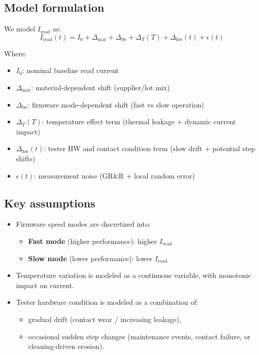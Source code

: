 \documentclass[11pt,a4paper]{article}
\begin{document}
	\subsection{Model formulation}
	We model $I_{\text{read}}$ as:
	\[
	I_{\text{read}}(t) = I_0 + \Delta_{\text{mat}} + \Delta_{\text{fw}} + \Delta_T(T) + \Delta_{\text{hw}}(t) + \epsilon(t)
	\]
	
	Where:
	\begin{itemize}[leftmargin=1.2em]
		\item $I_0$: nominal baseline read current
		\item $\Delta_{\text{mat}}$: material-dependent shift (supplier/lot mix)
		\item $\Delta_{\text{fw}}$: firmware mode-dependent shift (fast vs slow operation)
		\item $\Delta_T(T)$: temperature effect term (thermal leakage + dynamic current impact)
		\item $\Delta_{\text{hw}}(t)$: tester HW and contact condition term (slow drift + potential step shifts)
		\item $\epsilon(t)$: measurement noise (GR\&R + local random error)
	\end{itemize}
	
	\subsection{Key assumptions}
	\begin{itemize}[leftmargin=1.2em]
		\item Firmware speed modes are discretized into:
		\begin{itemize}[leftmargin=1.2em]
			\item \textbf{Fast mode} (higher performance): higher $I_{\text{read}}$
			\item \textbf{Slow mode} (lower performance): lower $I_{\text{read}}$
		\end{itemize}
		\item Temperature variation is modeled as a continuous variable, with monotonic impact on current.
		\item Tester hardware condition is modeled as a combination of:
		\begin{itemize}[leftmargin=1.2em]
			\item gradual drift (contact wear / increasing leakage),
			\item occasional sudden step changes (maintenance events, contact failure, or cleaning-driven erosion).
		\end{itemize}
	\end{itemize}
	
\end{document}
